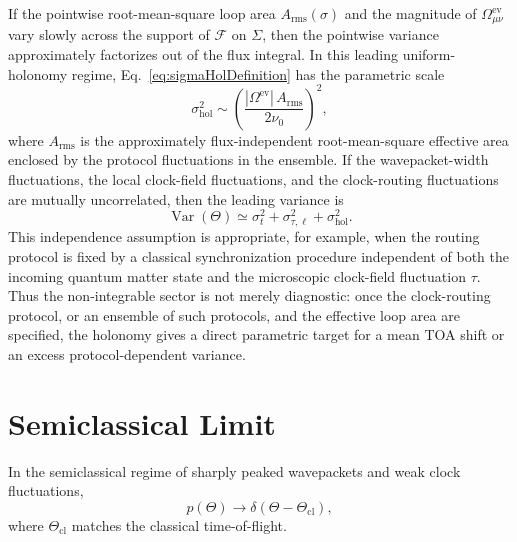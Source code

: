 \documentclass[11pt, a4paper]{article}
\theoremstyle{definition}
\theoremstyle{plain}
\theoremstyle{remark}
\numberwithin{equation}{section}
\begin{document}
            If the pointwise root-mean-square loop area $A_{\mathrm{rms}}(\sigma)$ and the magnitude of $\Omega^{\mathrm{ev}}_{\mu\nu}$ vary slowly across the support of $\mathcal{F}$ on $\Sigma$, then the pointwise variance approximately factorizes out of the flux integral. In this leading uniform-holonomy regime, Eq.~\eqref{eq:sigmaHolDefinition} has the parametric scale
            \begin{equation}
                \sigma_{\mathrm{hol}}^2
                \sim
                \left(\frac{|\Omega^{\mathrm{ev}}|\,A_{\mathrm{rms}}}{2\nu_0}\right)^2,
                \label{eq:sigmaHolEstimate}
            \end{equation}
            where $A_{\mathrm{rms}}$ is the approximately flux-independent root-mean-square effective area enclosed by the protocol fluctuations in the ensemble.
            If the wavepacket-width fluctuations, the local clock-field fluctuations, and the clock-routing fluctuations are mutually uncorrelated, then the leading variance is
            \begin{equation}
                \operatorname{Var}(\Theta)
                \simeq
                \sigma_t^2+\sigma_{\tau,\ell}^2+\sigma_{\mathrm{hol}}^2.
                \label{eq:holonomyVariance}
            \end{equation}
            This independence assumption is appropriate, for example, when the routing protocol is fixed by a classical synchronization procedure independent of both the incoming quantum matter state and the microscopic clock-field fluctuation $\tau$. Thus the non-integrable sector is not merely diagnostic: once the clock-routing protocol, or an ensemble of such protocols, and the effective loop area are specified, the holonomy gives a direct parametric target for a mean TOA shift or an excess protocol-dependent variance.

    \section{Semiclassical Limit}
    
    In the semiclassical regime of sharply peaked wavepackets and weak clock fluctuations,
    \begin{equation}
        p(\Theta)\to \delta(\Theta-\Theta_{\mathrm{cl}}),
    \end{equation}
    where $\Theta_{\mathrm{cl}}$ matches the classical time-of-flight.
\end{document}
